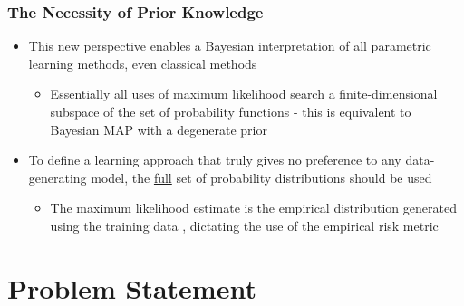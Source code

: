 \documentclass[aspectratio=169,usenames,dvipsnames]{beamer}
\begin{document}
\begin{frame}
\frametitle{The Necessity of Prior Knowledge}

\begin{itemize}
\item This new perspective enables a Bayesian interpretation of all parametric learning methods, even classical methods
\vspace{0.25em}
	\begin{itemize}
	\item Essentially all uses of maximum likelihood search a finite-dimensional subspace of the set of probability functions  - this is equivalent to Bayesian MAP with a \alert{degenerate prior}
	\end{itemize}
\vspace{0.5em}
\item To define a learning approach that truly gives no preference to any data-generating model, the \underline{full} set of probability distributions should be used
\vspace{0.25em}
	\begin{itemize}
	\item The maximum likelihood estimate is the \alert{empirical distribution} generated using the training data , dictating the use of the empirical risk metric
	\end{itemize}

\end{itemize}

\vspace{1em}
\centering
{}

\end{frame}







\section{Problem Statement}
\end{document}
